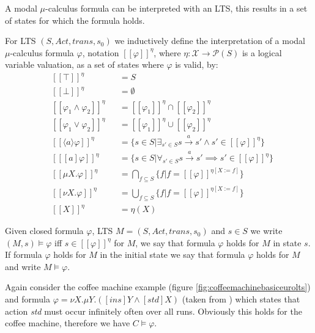 A modal $\mu$-calculus formula can be interpreted with an LTS, this results in a set of states for which the formula holds.
\begin{definition}
	\label{def_mu_sem} For LTS $(S, Act, trans, s_0)$ we inductively define the interpretation of a modal $\mu$-calculus formula $\varphi$, notation
	$[\![ \varphi ]\!]^\eta$, where $\eta : \mathcal{X} \rightarrow \mathcal{P}(S)$ is a logical variable valuation, as a set of states
	where $\varphi$ is valid, by:
	\begin{align*}
	&[\![ \mathit{\top} ]\!]^\eta &&= S\\
	&[\![ \mathit{\bot} ]\!]^\eta &&= \emptyset\\
	&[\![ \varphi_1 \wedge \varphi_2 ]\!]^\eta &&= [\![ \varphi_1 ]\!]^\eta \cap [\![ \varphi_2 ]\!]^\eta \\
	&[\![ \varphi_1 \vee \varphi_2 ]\!]^\eta &&= [\![ \varphi_1 ]\!]^\eta \cup [\![ \varphi_2 ]\!]^\eta\\
	&[\![ \langle a \rangle \varphi ]\!]^\eta &&= \{s \in S|\exists_{s' \in S} s \xrightarrow {a} s' \wedge s' \in [\![ \varphi ]\!]^\eta\}\\
	&[\![ [ a ] \varphi ]\!]^\eta &&= \{s \in S|\forall_{s' \in S} s \xrightarrow {a} s' \implies s' \in [\![ \varphi ]\!]^\eta\}\\
	&[\![ \mu X. \varphi ]\!]^\eta &&= \bigcap_{f \subseteq S}\{f | f = [\![ \varphi ]\!]^{\eta[X:=f]}\}\\
	&[\![ \nu X. \varphi ]\!]^\eta &&= \bigcup_{f \subseteq S}\{f | f = [\![ \varphi ]\!]^{\eta[X:=f]}\}\\
	&[\![ X ]\!]^\eta &&= \eta(X)
	\end{align*}
\end{definition}

Given closed formula $\varphi$, LTS $M = (S, Act, trans, s_0)$ and $s \in S$ we write $(M,s) \models \varphi$ iff $s \in [\![ \varphi ]\!]^\eta$ for $M$, we say that formula $\varphi$ holds for $M$ in state $s$. If formula $\varphi$ holds for $M$ in the initial state we say that formula $\varphi$ holds for $M$ and write $M \models \varphi$.

Again consider the coffee machine example (figure \ref{fig:coffeemachinebasiceurolts}) and formula $\varphi = \nu X. \mu Y. ([ins]Y \wedge [std] X)$ (taken from \cite{FamBasedModelCheckingWithMCRL2}) which states that action \textit{std} must occur infinitely often over all runs. Obviously this holds for the coffee machine, therefore we have $C \models \varphi$.

